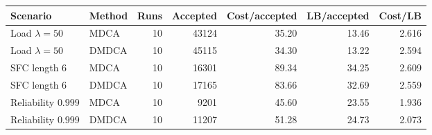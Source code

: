 \begin{tabular}{llrrrrr}
\toprule
Scenario & Method & Runs & Accepted & Cost/accepted & LB/accepted & Cost/LB \\
\midrule
Load $\lambda=50$ & MDCA & 10 & 43124 & 35.20 & 13.46 & 2.616 \\
Load $\lambda=50$ & DMDCA & 10 & 45115 & 34.30 & 13.22 & 2.594 \\
SFC length $6$ & MDCA & 10 & 16301 & 89.34 & 34.25 & 2.609 \\
SFC length $6$ & DMDCA & 10 & 17165 & 83.66 & 32.69 & 2.559 \\
Reliability $0.999$ & MDCA & 10 & 9201 & 45.60 & 23.55 & 1.936 \\
Reliability $0.999$ & DMDCA & 10 & 11207 & 51.28 & 24.73 & 2.073 \\
\bottomrule
\end{tabular}

